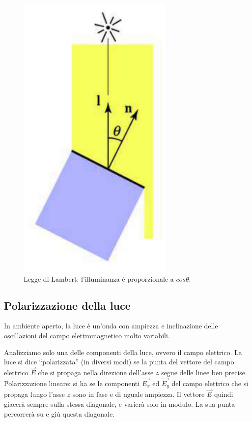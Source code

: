 \documentclass[a4paper,11pt]{article}
\begin{document}
\newpage
\renewcommand{\thefigure}{2.2}
\begin{figure}[!h]
  \centering
    \includegraphics[scale=0.4]{images/2/lamberts_law.png}
    \caption{Legge di Lambert: l'illuminanza è proporzionale a $cos\theta$.}
\end{figure}


\subsection{Polarizzazione della luce}
In ambiente aperto, la luce è un'onda con ampiezza e inclinazione delle oscillazioni del campo elettromagnetico molto variabili.
\par
Analizziamo solo una delle componenti della luce, ovvero il campo elettrico. La luce si dice ``polarizzata'' (in diversi modi) se la punta del vettore del campo elettrico $\overrightarrow{E}$
che si propaga nella direzione dell'asse $z$ segue delle linee ben precise.
\newline
Polarizzazione lineare: si ha se le componenti $\overrightarrow{E_x}$ ed $\overrightarrow{E_y}$ del campo elettrico che si propaga lungo l'asse $z$
sono in fase e di uguale ampiezza. Il vettore $\overrightarrow{E}$ quindi giacerà sempre sulla stessa diagonale, e varierà solo in modulo. La sua punta percorrerà su e giù questa diagonale.
\end{document}
